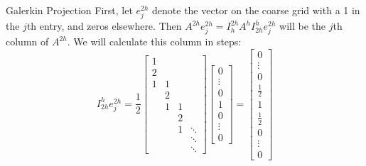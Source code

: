 \documentclass[11pt]{beamer}
\begin{document}
\begin{frame}{Galerkin Projection}
  First, let \(e_j^{2h}\) denote the vector on the coarse grid with a 1 in
  the \(j\)th entry, and zeros elsewhere. Then \(A^{2h}e_j^{2h} = I_h^{2h}A^{h}I^h_{2h}e_j^{2h}\) will be
  the \(j\)th column of \(A^{2h}\). We will calculate this column in
  steps: \[
    I_{2h}^{h}e_j^{2h} =
    \frac{1}{2}
    \begin{bmatrix}
      1 &   &   & \\
      2 &   &   & \\
      1 & 1 &   & \\
      & 2 &   & \\
      & 1 & 1 & \\
      &   & 2 & \\
      &   & 1 & \ddots \\
      &   &   & \ddots \\
      &   &   & \ddots
    \end{bmatrix}
    \begin{bmatrix}
      0 \\ \vdots \\ 0 \\ 1 \\ 0 \\ \vdots \\ 0
    \end{bmatrix}
    =
    \begin{bmatrix}
      0 \\ \vdots \\ 0 \\ \frac{1}{2} \\ 1 \\ \frac{1}{2} \\ 0 \\ \vdots \\ 0
    \end{bmatrix}
  \]
\end{frame}
\end{document}
